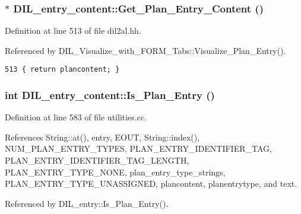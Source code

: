 \subsubsection{$\ast$ DIL\_\-entry\_\-content::Get\_\-Plan\_\-Entry\_\-Content ()\hspace{0.3cm}{\tt  [inline]}}\label{classDIL__entry__content_a3}




Definition at line 513 of file dil2al.hh.

Referenced by DIL\_\-Visualize\_\-with\_\-FORM\_\-Tabs::Visualize\_\-Plan\_\-Entry().



\footnotesize\begin{verbatim}513 { return plancontent; }
\end{verbatim}\normalsize 
{}
\subsubsection{\setlength{\rightskip}{0pt plus 5cm}int DIL\_\-entry\_\-content::Is\_\-Plan\_\-Entry ()}\label{classDIL__entry__content_a2}




Definition at line 583 of file utilities.cc.

References String::at(), entry, EOUT, String::index(), NUM\_\-PLAN\_\-ENTRY\_\-TYPES, PLAN\_\-ENTRY\_\-IDENTIFIER\_\-TAG, PLAN\_\-ENTRY\_\-IDENTIFIER\_\-TAG\_\-LENGTH, PLAN\_\-ENTRY\_\-TYPE\_\-NONE, plan\_\-entry\_\-type\_\-strings, PLAN\_\-ENTRY\_\-TYPE\_\-UNASSIGNED, plancontent, planentrytype, and text.

Referenced by DIL\_\-entry::Is\_\-Plan\_\-Entry().



